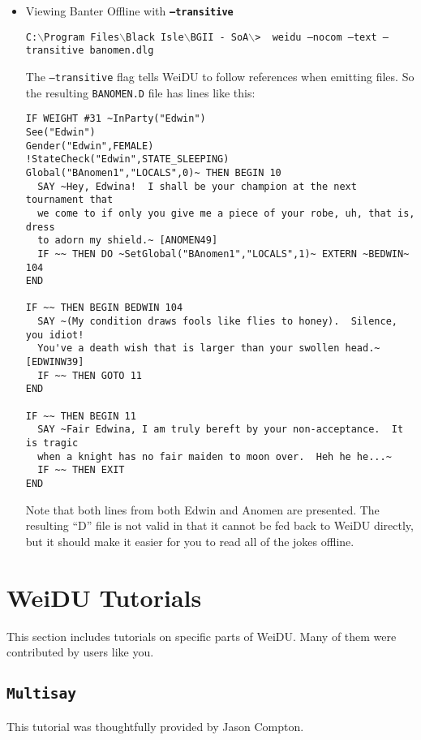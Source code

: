 \documentclass{article}
\def\ttref#1{\ahrefloc{#1}{\tt #1}}
\def\DEFSYN#1{{\tt \bf #1}\index{#1}}
\def\t#1{{\tt #1}}
\def\CMD#1{{\tt {C:$\backslash$Program Files$\backslash$Black Isle$\backslash$BGII - SoA$\backslash$>} \color{red} \t{#1} }}
\begin{document}
\begin{itemize}
\item Viewing Banter Offline with \DEFSYN{--transitive}

\CMD{ weidu --nocom --text --transitive banomen.dlg }

The \t{--transitive} flag tells WeiDU to follow \ttref{EXTERN}
references when emitting \ttref{D} files. So the resulting \t{BANOMEN.D}
file has lines like this:

\begin{verbatim}
IF WEIGHT #31 ~InParty("Edwin")
See("Edwin")
Gender("Edwin",FEMALE)
!StateCheck("Edwin",STATE_SLEEPING)
Global("BAnomen1","LOCALS",0)~ THEN BEGIN 10
  SAY ~Hey, Edwina!  I shall be your champion at the next tournament that
  we come to if only you give me a piece of your robe, uh, that is, dress
  to adorn my shield.~ [ANOMEN49]
  IF ~~ THEN DO ~SetGlobal("BAnomen1","LOCALS",1)~ EXTERN ~BEDWIN~ 104
END

IF ~~ THEN BEGIN BEDWIN 104
  SAY ~(My condition draws fools like flies to honey).  Silence, you idiot!
  You've a death wish that is larger than your swollen head.~ [EDWINW39]
  IF ~~ THEN GOTO 11
END

IF ~~ THEN BEGIN 11
  SAY ~Fair Edwina, I am truly bereft by your non-acceptance.  It is tragic
  when a knight has no fair maiden to moon over.  Heh he he...~
  IF ~~ THEN EXIT
END
\end{verbatim}

Note that both lines from both Edwin and Anomen are presented. The
resulting ``D'' file is not valid in that it cannot be fed back to WeiDU
directly, but it should make it easier for you to read all of the jokes
offline.

\end{itemize}

\section{WeiDU Tutorials}

This section includes tutorials on specific parts of WeiDU. Many of them
were contributed by users like you.

\subsection{\t{Multisay}}
\label{Multisay}
This tutorial was thoughtfully provided by Jason Compton.
\end{document}
